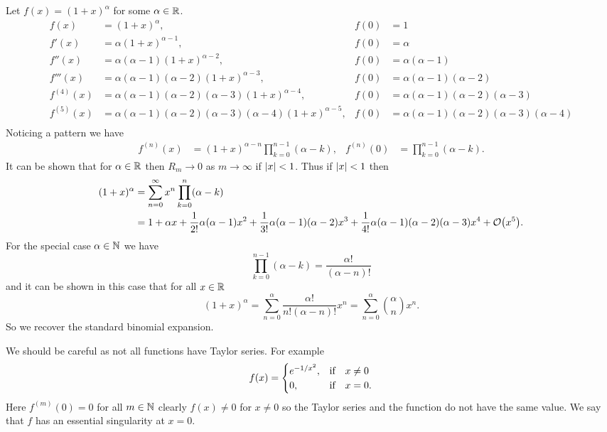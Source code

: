 \documentclass[a4paper]{article}
\begin{document}
    Let \(f(x) = (1 + x)^\alpha\) for some \(\alpha\in\mathbb{R}\).
    \begin{align*}
        f(x) &= (1 + x)^{\alpha}, & f(0) &= 1\\
        f'(x) &= \alpha(1 + x)^{\alpha-1}, & f(0) &= \alpha\\
        f''(x) &= \alpha(\alpha-1)(1 + x)^{\alpha-2}, & f(0) &= \alpha(\alpha-1)\\
        f'''(x) &= \alpha(\alpha-1)(\alpha-2)(1 + x)^{\alpha-3}, & f(0) &= \alpha(\alpha-1)(\alpha-2)\\
        f^{(4)}(x) &= \alpha(\alpha-1)(\alpha-2)(\alpha-3)(1 + x)^{\alpha-4}, & f(0) &= \alpha(\alpha-1)(\alpha-2)(\alpha-3)\\
        f^{(5)}(x) &= \alpha(\alpha-1)(\alpha-2)(\alpha-3)(\alpha-4)(1 + x)^{\alpha-5}, & f(0) &= \alpha(\alpha-1)(\alpha-2)(\alpha-3)(\alpha-4)\\
    \end{align*}
    Noticing a pattern we have
    \begin{align*}
        f^{(n)}(x) &= (1 + x)^{\alpha-n}\prod_{k=0}^{n-1}(\alpha-k), & f^{(n)}(0) &= \prod_{k=0}^{n-1}(\alpha - k).
    \end{align*}
    It can be shown that for \(\alpha\in\mathbb{R}\) then \(R_m\to 0\) as \(m\to\infty\) if \(\abs{x} < 1\).
    Thus if \(\abs{x} < 1\) then
    \begin{align*}
        (1 + x)^\alpha &= \sum_{n=0}^{\infty} x^n\prod_{k=0}^{n}(\alpha - k)\\
        &= 1 + \alpha x + \frac{1}{2!}\alpha(\alpha-1)x^2 + \frac{1}{3!}\alpha(\alpha-1)(\alpha-2)x^3 + \frac{1}{4!}\alpha(\alpha-1)(\alpha-2)(\alpha-3)x^4 + \order{x^5}.
    \end{align*}
    For the special case \(\alpha\in\mathbb{N}\) we have
    \[\prod_{k=0}^{n-1} (\alpha - k) = \frac{\alpha!}{(\alpha - n)!}\]
    and it can be shown in this case that for all \(x\in\mathbb{R}\)
    \[(1 + x)^{\alpha} = \sum_{n=0}^{\alpha}\frac{\alpha!}{n!(\alpha - n)!}x^n = \sum_{n=0}^{\alpha}\binom{\alpha}{n}x^n.\]
    So we recover the standard binomial expansion.
    
    We should be careful as not all functions have Taylor series.
    For example
    \[
        f(x) = 
        \begin{cases}
            e^{-1/x^2}, & \qif* x \ne 0\\
            0, &\qif* x = 0.
        \end{cases}
    \]
    Here \(f^{(m)}(0) = 0\) for all \(m\in\mathbb{N}\) clearly \(f(x)\ne 0\) for \(x\ne 0\) so the Taylor series and the function do not have the same value.
    We say that \(f\) has an essential singularity at \(x = 0\).
    
\end{document}
